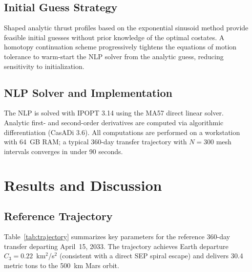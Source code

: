 \documentclass{aiaa-tc}
\begin{document}
\subsection{Initial Guess Strategy}

Shaped analytic thrust profiles based on the exponential sinusoid method
\cite{wall2009} provide feasible initial guesses without prior knowledge of
the optimal costates.  A homotopy continuation scheme progressively tightens
the equations of motion tolerance to warm-start the NLP solver from the analytic
guess, reducing sensitivity to initialization.

\subsection{NLP Solver and Implementation}

The NLP is solved with IPOPT 3.14 using the MA57 direct linear solver.  Analytic
first- and second-order derivatives are computed via algorithmic differentiation
(CasADi 3.6).  All computations are performed on a workstation with 64~GB RAM;
a typical 360-day transfer trajectory with $N = 300$ mesh intervals converges
in under 90 seconds.

\section{Results and Discussion}
\label{sec:results}

\subsection{Reference Trajectory}

Table~\ref{tab:trajectory} summarizes key parameters for the reference
360-day transfer departing April~15, 2033.  The trajectory achieves Earth
departure $C_3 = 0.22$~km$^2$/s$^2$ (consistent with a direct SEP spiral
escape) and delivers 30.4 metric tons to the 500~km Mars orbit.
\end{document}
